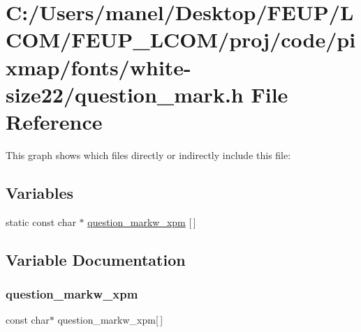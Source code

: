 \hypertarget{white-size22_2question__mark_8h}{}\section{C\+:/\+Users/manel/\+Desktop/\+F\+E\+U\+P/\+L\+C\+O\+M/\+F\+E\+U\+P\+\_\+\+L\+C\+O\+M/proj/code/pixmap/fonts/white-\/size22/question\+\_\+mark.h File Reference}
\label{white-size22_2question__mark_8h}
This graph shows which files directly or indirectly include this file\+:
\subsection*{Variables}
\begin{DoxyCompactItemize}
\item 
static const char $\ast$ \mbox{\hyperlink{white-size22_2question__mark_8h_aa4741031ef0acf14500c26fe4bebd2c3}{question\+\_\+markw\+\_\+xpm}} \mbox{[}$\,$\mbox{]}
\end{DoxyCompactItemize}


\subsection{Variable Documentation}
\mbox{\label{white-size22_2question__mark_8h_aa4741031ef0acf14500c26fe4bebd2c3}} 
\subsubsection{\texorpdfstring{question\_markw\_xpm}{question\_markw\_xpm}}
{\footnotesize\ttfamily const char$\ast$ question\+\_\+markw\+\_\+xpm\mbox{[}$\,$\mbox{]}\hspace{0.3cm}{\ttfamily [static]}}

